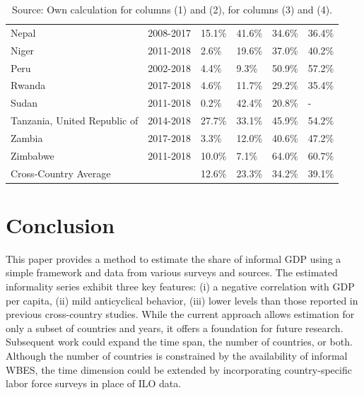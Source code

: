\documentclass[letterpaper, 12pt]{article}
\begin{document}
\begin{table}[ht]
\begin{tabular}{l l | p{2cm} p{2cm} | p{2cm} p{2cm}}
        Nepal & 2008-2017 & 15.1\% & 41.6\% & 34.6\% & 36.4\% \\
        Niger & 2011-2018 & 2.6\% & 19.6\% & 37.0\% & 40.2\% \\
        Peru & 2002-2018 & 4.4\% & 9.3\% & 50.9\% & 57.2\% \\
        Rwanda & 2017-2018 & 4.6\% & 11.7\% & 29.2\% & 35.4\% \\
        Sudan & 2011-2018 & 0.2\% & 42.4\% & 20.8\% & - \\
        Tanzania, United Republic of & 2014-2018 & 27.7\% & 33.1\% & 45.9\% & 54.2\% \\
        Zambia & 2017-2018 & 3.3\% & 12.0\% & 40.6\% & 47.2\% \\
        Zimbabwe & 2011-2018 & 10.0\% & 7.1\% & 64.0\% & 60.7\% \\
        \hline
        Cross-Country Average &  & 12.6\% & 23.3\% & 34.2\% & 39.1\% \\
        \hline
        \hline
        \end{tabular}
        \caption*{\footnotesize Source: Own calculation for columns (1) and (2), \textcolor{blue}{\textcite{elginetal2021}} for columns (3) and (4).}
    \end{table}

    \section{Conclusion}\label{sec_concl}
    This paper provides a method to estimate the share of informal GDP using a simple framework and data from various surveys and sources. The estimated informality series exhibit three key features: (i) a negative correlation with GDP per capita, (ii) mild anticyclical behavior, (iii) lower levels than those reported in previous cross-country studies. While the current approach allows estimation for only a subset of countries and years, it offers a foundation for future research. Subsequent work could expand the time span, the number of countries, or both. Although the number of countries is constrained by the availability of informal WBES, the time dimension could be extended by incorporating country-specific labor force surveys in place of ILO data.
\end{document}
